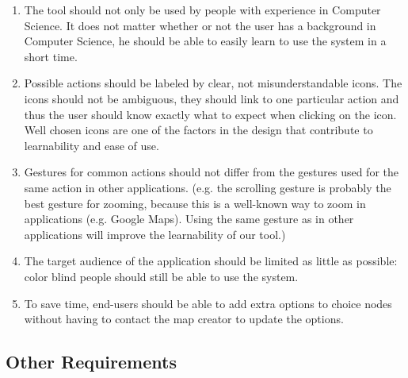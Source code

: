 \begin{enumerate}[label=\textbf{UR \arabic*}., ref=UR \arabic*, labelindent=0.5cm, leftmargin=*]

	\item \label{ur:intuitiveness}
		The tool should not only be used by people with experience in Computer Science. It does not matter whether or not the user has a background in Computer Science, he should be able to easily learn to use the system in a short time.
	
	\item \label{ur:icons}
		Possible actions should be labeled by clear, not misunderstandable icons. The icons should not be ambiguous, they should link to one particular action and thus the user should know exactly what to expect when clicking on the icon. Well chosen icons are one of the factors in the design that contribute to learnability and ease of use.
	
	\item \label{ur:gestures}
		Gestures for common actions should not differ from the gestures used for the same action in other applications. (e.g. the scrolling gesture is probably the best gesture for zooming, because this is a well-known way to zoom in applications (e.g. Google Maps). Using the same gesture as in other applications will improve the learnability of our tool.)
	
	\item \label{ur:accessibility}
		The target audience of the application should be limited as little as possible: color blind people should still be able to use the system.
	
	\item \label{ur:time}
		To save time, end-users should be able to add extra options to choice nodes without having to contact the map creator to update the options.
	
\end{enumerate}



\subsection{Other Requirements}\label{sec:other-requirements}

